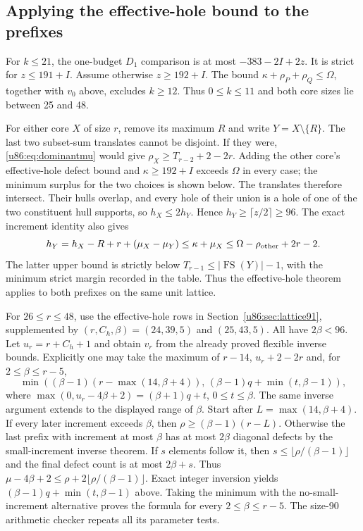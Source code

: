 \documentclass[11pt,a4paper]{article}
\theoremstyle{remark}
\newcommand{\FS}{\operatorname{FS}}
\begin{document}
\subsection{Applying the effective-hole bound to the prefixes}
For $k\le21$, the one-budget $D_1$ comparison is at most
$-383-2I+2z$. It is strict for $z\le191+I$. Assume otherwise
$z\ge192+I$. The bound
$\kappa+\rho_P+\rho_Q\le\Omega$, together with $v_0$ above, excludes
$k\ge12$. Thus $0\le k\le11$ and both core sizes lie between 25 and 48.

For either core $X$ of size $r$, remove its maximum $R$ and write
$Y=X\setminus\{R\}$. The last two subset-sum translates cannot be
disjoint. If they were, \eqref{u86:eq:dominantmu} would give
$\rho_X\ge T_{r-2}+2-2r$. Adding the other core's effective-hole
defect bound and $\kappa\ge192+I$ exceeds $\Omega$ in every case;
the minimum surplus for the two choices is shown below.
The translates therefore intersect. Their hulls overlap, and every hole
of their union is a hole of one of the two constituent hull supports, so
$h_X\le2h_Y$. Hence $h_Y\ge\lceil z/2\rceil\ge96$.
The exact increment identity also gives
\[
 h_Y=h_X-R+r+(\mu_X-\mu_Y)
 \le\kappa+\mu_X\le\Omega-\rho_{\rm other}+2r-2.
\]
The latter upper bound is strictly below $T_{r-1}\le|\FS(Y)|-1$,
with the minimum strict margin recorded in the table. Thus the
effective-hole theorem applies to both prefixes on the same unit lattice.

For $26\le r\le48$, use the effective-hole rows in
Section~\ref{u86:sec:lattice91}, supplemented by $(r,C_h,\beta)=(24,39,5)$
and $(25,43,5)$. All have $2\beta<96$. Let $u_r=r+C_h+1$ and obtain
$v_r$ from the already proved flexible inverse bounds. Explicitly one may
take the maximum of $r-14$, $u_r+2-2r$ and, for $2\le\beta\le r-5$,
\[
 \min\!\left((\beta-1)(r-\max(14,\beta+4)),\,
 (\beta-1)q+\min(t,\beta-1)\right),
\]
where $\max(0,u_r-4\beta+2)=(\beta+1)q+t$, $0\le t\le\beta$.
The same inverse argument extends to the displayed range of $\beta$.
Start after $L=\max(14,\beta+4)$. If every later increment exceeds
$\beta$, then $\rho\ge(\beta-1)(r-L)$. Otherwise the last prefix
with increment at most $\beta$ has at most $2\beta$ diagonal defects
by the small-increment inverse theorem. If $s$ elements follow it,
then $s\le\lfloor\rho/(\beta-1)\rfloor$ and the final defect count
is at most $2\beta+s$. Thus
$\mu-4\beta+2\le\rho+2\lfloor\rho/(\beta-1)\rfloor$.
Exact integer inversion yields $(\beta-1)q+\min(t,\beta-1)$ above.
Taking the minimum with the no-small-increment alternative proves the
formula for every $2\le\beta\le r-5$. The size-90 arithmetic checker
repeats all its parameter tests.
\end{document}
